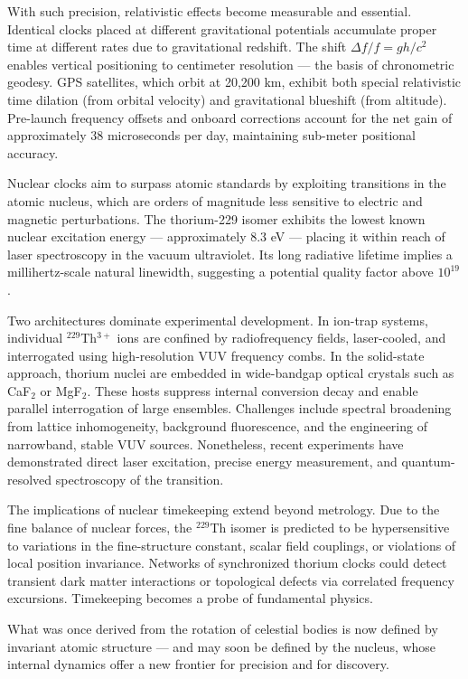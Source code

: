 With such precision, relativistic effects become measurable and essential. Identical clocks placed at different gravitational potentials accumulate proper time at different rates due to gravitational redshift. The shift $\Delta f/f = gh/c^2$ enables vertical positioning to centimeter resolution — the basis of chronometric geodesy. GPS satellites, which orbit at 20,200 km, exhibit both special relativistic time dilation (from orbital velocity) and gravitational blueshift (from altitude). Pre-launch frequency offsets and onboard corrections account for the net gain of approximately 38 microseconds per day, maintaining sub-meter positional accuracy.

Nuclear clocks aim to surpass atomic standards by exploiting transitions in the atomic nucleus, which are orders of magnitude less sensitive to electric and magnetic perturbations. The thorium-229 isomer exhibits the lowest known nuclear excitation energy — approximately 8.3 eV — placing it within reach of laser spectroscopy in the vacuum ultraviolet. Its long radiative lifetime implies a millihertz-scale natural linewidth, suggesting a potential quality factor above $10^{19}$.

Two architectures dominate experimental development. In ion-trap systems, individual $^{229}$Th$^{3+}$ ions are confined by radiofrequency fields, laser-cooled, and interrogated using high-resolution VUV frequency combs. In the solid-state approach, thorium nuclei are embedded in wide-bandgap optical crystals such as CaF$_2$ or MgF$_2$. These hosts suppress internal conversion decay and enable parallel interrogation of large ensembles. Challenges include spectral broadening from lattice inhomogeneity, background fluorescence, and the engineering of narrowband, stable VUV sources. Nonetheless, recent experiments have demonstrated direct laser excitation, precise energy measurement, and quantum-resolved spectroscopy of the transition.

The implications of nuclear timekeeping extend beyond metrology. Due to the fine balance of nuclear forces, the $^{229}$Th isomer is predicted to be hypersensitive to variations in the fine-structure constant, scalar field couplings, or violations of local position invariance. Networks of synchronized thorium clocks could detect transient dark matter interactions or topological defects via correlated frequency excursions. Timekeeping becomes a probe of fundamental physics.

What was once derived from the rotation of celestial bodies is now defined by invariant atomic structure — and may soon be defined by the nucleus, whose internal dynamics offer a new frontier for precision and for discovery.
